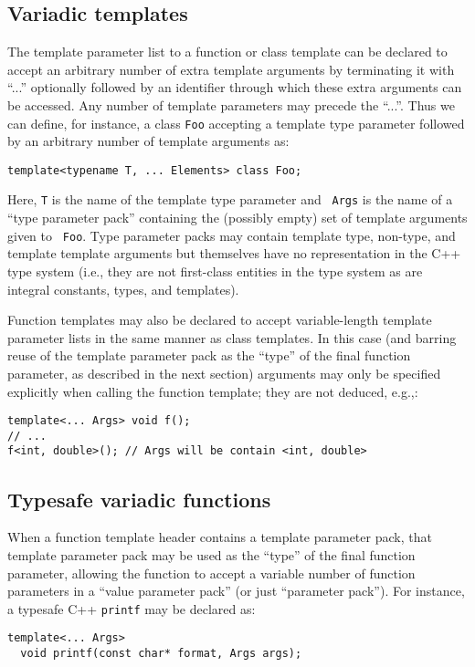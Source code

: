 \documentclass{article}
\begin{document}
\subsection{Variadic templates}
\par The template parameter list to a function or class template can
be declared to accept an arbitrary number of extra template arguments
by terminating it with ``...'' optionally followed by an identifier
through which these extra arguments can be accessed.
Any number of template
parameters may precede the ``...''. Thus we can define, for instance,
a class {\tt Foo} accepting a template type parameter followed by an
arbitrary number of template arguments as:
\begin{verbatim}
template<typename T, ... Elements> class Foo;
\end{verbatim}

Here, {\tt T} is the name of the template type parameter and {\tt
  Args} is the name of a ``type parameter pack'' containing
the (possibly empty) set of template arguments given to {\tt
  Foo}. Type parameter packs may contain template type, non-type, and
template template arguments but themselves have no representation in
the C++ type system (i.e., they are not first-class entities in the
type system as are integral constants, types, and templates).

Function templates may also be declared to accept variable-length
template parameter lists in the same manner as class templates. In
this case (and barring reuse of the template parameter pack as the
``type'' of the final function parameter, as described in the next
section) arguments may only be specified explicitly when calling the
function template; they are not deduced, e.g.,:

\begin{verbatim}
template<... Args> void f();
// ... 
f<int, double>(); // Args will be contain <int, double>
\end{verbatim}

\subsection{Typesafe variadic functions}
When a function template header contains a template parameter pack,
that template parameter pack may be used as the ``type'' of the final
function parameter, allowing the function to accept a variable number
of function parameters in a ``value parameter pack'' (or just
``parameter pack''). For instance, a typesafe C++ {\tt printf} may
be declared as:
\begin{verbatim}
template<... Args>
  void printf(const char* format, Args args);
\end{verbatim}
\end{document}
